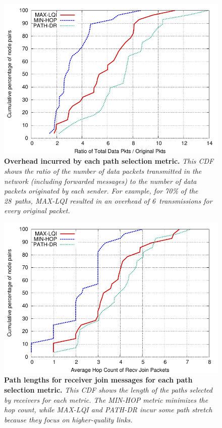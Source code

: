 \begin{figure}[t]
\begin{center}
\includegraphics[width=0.6\hsize]{resources/tinyadmr-techrept05/figures/lessons/lqivshop/lqi-hop-pathdr-cdf-oh.pdf}
\end{center}
\caption{{\small {\bf Overhead incurred by each path selection
metric.} {\em This CDF shows the ratio of the number of 
data packets transmitted in the network (including forwarded messages)
to the number of data packets originated by each sender. 
For example, for 70\% of the 28~paths, MAX-LQI resulted in an
overhead of 6~transmissions for every original packet.}}}
\label{fig-overhead}
\end{figure}

\begin{figure}[t]
\begin{center}
\includegraphics[width=0.6\hsize]{resources/tinyadmr-techrept05/figures/lessons/lqivshop/lqi-hop-pathdr-cdf-rcv.pdf}
\end{center}
\caption{{\small {\bf Path lengths for receiver join messages for each
path selection metric.} {\em This CDF shows the length of
the paths selected by receivers for each metric. The MIN-HOP metric
minimizes the hop count, while MAX-LQI and PATH-DR incur some path
stretch because they focus on higher-quality links.}}}
\label{fig-pathlength}
\end{figure}

